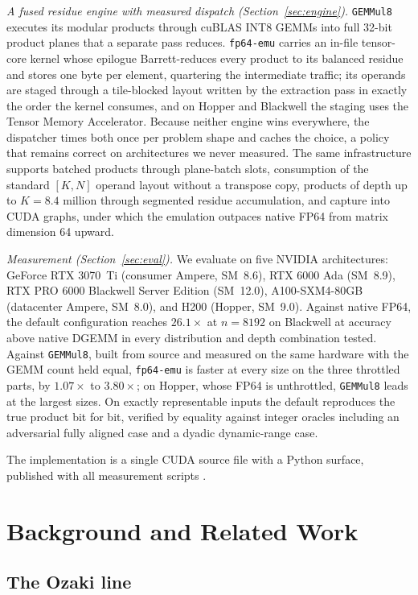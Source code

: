 \documentclass[11pt]{amsart}
\theoremstyle{plain}
\theoremstyle{definition}
\newcommand{\code}[1]{\texttt{#1}}
\newcommand{\fpemu}{\code{fp64-emu}}
\newcommand{\gemmul}{\code{GEMMul8}}
\begin{document}
\emph{A fused residue engine with measured dispatch
(Section~\ref{sec:engine}).} \gemmul{} executes its modular products
through cuBLAS INT8 GEMMs into full 32-bit product planes that a separate
pass reduces. \fpemu{} carries an in-file tensor-core kernel whose epilogue
Barrett-reduces every product to its balanced residue and stores one byte
per element, quartering the intermediate traffic; its operands are staged
through a tile-blocked layout written by the extraction pass in exactly the
order the kernel consumes, and on Hopper and Blackwell the staging uses the
Tensor Memory Accelerator. Because neither engine wins everywhere, the
dispatcher times both once per problem shape and caches the choice, a
policy that remains correct on architectures we never measured. The same
infrastructure supports batched products through plane-batch slots,
consumption of the standard $[K, N]$ operand layout without a transpose
copy, products of depth up to $K = 8.4$ million through segmented residue
accumulation, and capture into CUDA graphs, under which the emulation
outpaces native FP64 from matrix dimension 64 upward.

\emph{Measurement (Section~\ref{sec:eval}).} We evaluate on five NVIDIA
architectures: GeForce RTX 3070~Ti (consumer Ampere, SM~8.6), RTX 6000
Ada (SM~8.9), RTX PRO 6000 Blackwell Server Edition (SM~12.0),
A100-SXM4-80GB (datacenter Ampere, SM~8.0), and H200 (Hopper, SM~9.0).
Against native FP64, the default configuration reaches $26.1\times$ at
$n = 8192$ on Blackwell at accuracy above native DGEMM in every
distribution and depth combination tested. Against \gemmul{}, built from
source and measured on the same hardware with the GEMM count held equal,
\fpemu{} is faster at every size on the three throttled parts, by
$1.07\times$ to $3.80\times$; on Hopper, whose FP64 is unthrottled,
\gemmul{} leads at the largest sizes. On exactly representable inputs the
default reproduces the true product bit for bit, verified by equality
against integer oracles including an adversarial fully aligned case and a
dyadic dynamic-range case.

The implementation is a single CUDA source file with a Python surface,
published with all measurement scripts \cite{fpemurepo}.

\section{Background and Related Work}\label{sec:background}

\subsection{The Ozaki line}
\end{document}

